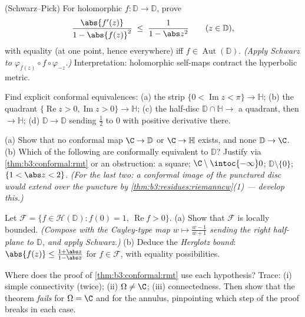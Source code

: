 \begin{exercise}[$\star\star$]\label{exo:b3:conformal:3}
(Schwarz--Pick) For holomorphic $f\colon \mathbb D \to
\mathbb D$, prove
\[
\frac{\abs{f'(z)}}{1 - \abs{f(z)}^2} \;\leq\;
\frac{1}{1 - \abs z^2}
\qquad (z \in \mathbb D),
\]
with equality (at one point, hence everywhere) iff $f \in
\operatorname{Aut}(\mathbb D)$.
\emph{(Apply Schwarz to $\varphi_{f(z)}\circ
f\circ\varphi_{-z}$.)} Interpretation: holomorphic self-maps
contract the hyperbolic metric.
\end{exercise}

\begin{exercise}[$\star\star$]\label{exo:b3:conformal:4}
Find explicit conformal equivalences:
(a) the strip $\{0 < \operatorname{Im}z < \pi\} \to \mathbb H$;
(b) the quadrant $\{\operatorname{Re}z > 0,
\operatorname{Im}z > 0\} \to \mathbb H$;
(c) the half-disc $\mathbb D\cap\mathbb H \to$ a quadrant,
then $\to \mathbb H$;
(d) $\mathbb D \to \mathbb D$ sending $\frac12$ to $0$ with
positive derivative there.
\end{exercise}

\begin{exercise}[$\star\star$]\label{exo:b3:conformal:5}
(a) Show that no conformal map $\C \to \mathbb D$ or $\C \to
\mathbb H$ exists, and none $\mathbb D \to \C$.
(b) Which of the following are conformally equivalent to
$\mathbb D$? Justify via \cref{thm:b3:conformal:rmt} or an
obstruction: a square; $\C\setminus\intoc{-\infty}0$;
$\mathbb D\setminus\{0\}$; $\{1 < \abs z < 2\}$.
\emph{(For the last two: a conformal image of the punctured
disc would extend over the puncture by
\cref{thm:b3:residues:riemanncw}(1) --- develop this.)}
\end{exercise}

\begin{exercise}[$\star\star$]\label{exo:b3:conformal:6}
Let $\mathcal F = \{f \in \mathcal H(\mathbb D) : f(0) = 1,\
\operatorname{Re}f > 0\}$.
(a) Show that $\mathcal F$ is locally bounded.
\emph{(Compose with the Cayley-type map $w \mapsto \frac{w -
1}{w + 1}$ sending the right half-plane to $\mathbb D$, and
apply Schwarz.)}
(b) Deduce the \emph{Herglotz bound}: $\abs{f(z)} \leq
\frac{1 + \abs z}{1 - \abs z}$ for $f \in \mathcal F$, with
equality possibilities.
\end{exercise}

\begin{exercise}[$\star\star\star$]\label{exo:b3:conformal:7}
Where does the proof of \cref{thm:b3:conformal:rmt} use each
hypothesis? Trace: (i) simple connectivity (twice); (ii)
$\Omega \neq \C$; (iii) connectedness. Then show that the
theorem \emph{fails} for $\Omega = \C$ and for the annulus,
pinpointing which step of the proof breaks in each case.
\end{exercise}

